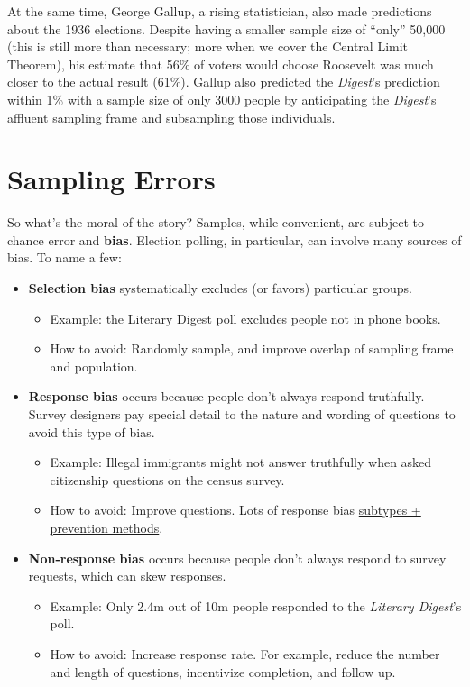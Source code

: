 \documentclass[
  letterpaper,
  DIV=11,
  numbers=noendperiod]{scrreprt}
\providecommand{\tightlist}{%
  \setlength{\itemsep}{0pt}\setlength{\parskip}{0pt}}\usepackage{longtable,booktabs,array}
\begin{document}
At the same time, George Gallup, a rising statistician, also made
predictions about the 1936 elections. Despite having a smaller sample
size of ``only'' 50,000 (this is still more than necessary; more when we
cover the Central Limit Theorem), his estimate that 56\% of voters would
choose Roosevelt was much closer to the actual result (61\%). Gallup
also predicted the \emph{Digest}'s prediction within 1\% with a sample
size of only 3000 people by anticipating the \emph{Digest}'s affluent
sampling frame and subsampling those individuals.

\section{Sampling Errors}\label{sampling-errors}

So what's the moral of the story? Samples, while convenient, are subject
to chance error and \textbf{bias}. Election polling, in particular, can
involve many sources of bias. To name a few:

\begin{itemize}
\tightlist
\item
  \textbf{Selection bias} systematically excludes (or favors) particular
  groups.

  \begin{itemize}
  \tightlist
  \item
    Example: the Literary Digest poll excludes people not in phone
    books.
  \item
    How to avoid: Randomly sample, and improve overlap of sampling frame
    and population.
  \end{itemize}
\item
  \textbf{Response bias} occurs because people don't always respond
  truthfully. Survey designers pay special detail to the nature and
  wording of questions to avoid this type of bias.

  \begin{itemize}
  \tightlist
  \item
    Example: Illegal immigrants might not answer truthfully when asked
    citizenship questions on the census survey.
  \item
    How to avoid: Improve questions. Lots of response bias
    \href{https://en.wikipedia.org/wiki/Response_bias\#:~:text=\%5B7\%5D-,Types,-\%5Bedit\%5D}{subtypes
    + prevention methods}.
  \end{itemize}
\item
  \textbf{Non-response bias} occurs because people don't always respond
  to survey requests, which can skew responses.

  \begin{itemize}
  \tightlist
  \item
    Example: Only 2.4m out of 10m people responded to the \emph{Literary
    Digest}'s poll.
  \item
    How to avoid: Increase response rate. For example, reduce the number
    and length of questions, incentivize completion, and follow up.
  \end{itemize}
\end{itemize}
\end{document}
